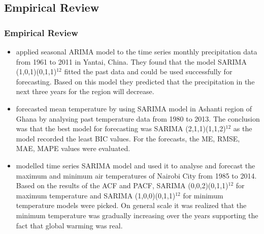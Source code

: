 \documentclass[]{beamer}
\begin{document}
\subsection{Empirical Review}
\begin{frame}
\fontsize{8pt}{7.2}\selectfont
\frametitle{Empirical Review}
\begin{itemize}
\item\cite{26} applied seasonal ARIMA model to the time series monthly precipitation data from 1961 to 2011 in Yantai, China. They found that the model SARIMA (1,0,1)(0,1,1)$^{12}$ fitted the past data and could be used successfully for forecasting. Based on this model they predicted that the  precipitation  in the next three years for the region  will decrease.
\item\cite{23} forecasted mean temperature by using SARIMA model in Ashanti region of Ghana by analysing past temperature data from 1980 to 2013. The conclusion was that the best model for forecasting was SARIMA (2,1,1)(1,1,2)$^{12}$ as the model recorded the least BIC values. For the forecasts, the ME, RMSE, MAE, MAPE values were evaluated.
\item\cite{22} modelled time series SARIMA model and used it to analyse and forecast the maximum and minimum air temperatures of Nairobi City from 1985 to 2014. Based on the results of the ACF and PACF, SARIMA (0,0,2)(0,1,1)$^{12}$ for maximum temperature and SARIMA (1,0,0)(0,1,1)$^{12}$ for minimum temperature models were picked. On general scale it was realized that the minimum temperature was gradually increasing over the years supporting the fact that global warming was real.
\end{itemize}	
\end{frame}
\end{document}

